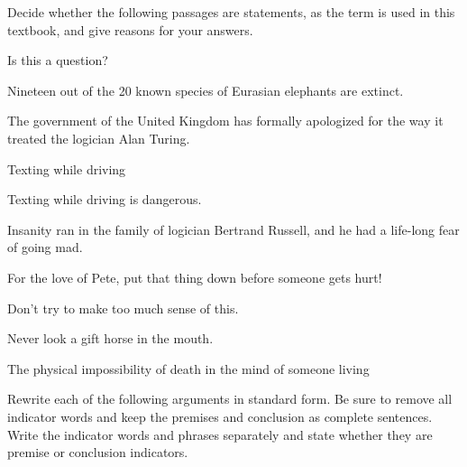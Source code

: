 \noindent\problempart Decide whether the following passages are statements, as the term is used in this textbook, and give reasons for your answers.
\begin{exercises}
\item Is this a question? 
\item Nineteen out of the 20 known species of Eurasian elephants are extinct. 
\item The government of the United Kingdom has formally apologized for the way it treated the logician Alan Turing.  

\item Texting while driving 
\item Texting while driving is dangerous. 
\item Insanity ran in the family of logician Bertrand Russell, and he had a life-long fear of going mad. 
\item For the love of Pete, put that thing down before someone gets hurt!  
\item Don't try to make too much sense of this. 
\item Never look a gift horse in the mouth.  
\item The physical impossibility of death in the mind of someone living  
\end{exercises}

\noindent\problempart Rewrite each of the following arguments in standard form. Be sure to remove all indicator words and keep the premises and conclusion as complete sentences. Write the indicator words and phrases separately and state whether they are premise or conclusion indicators. 


